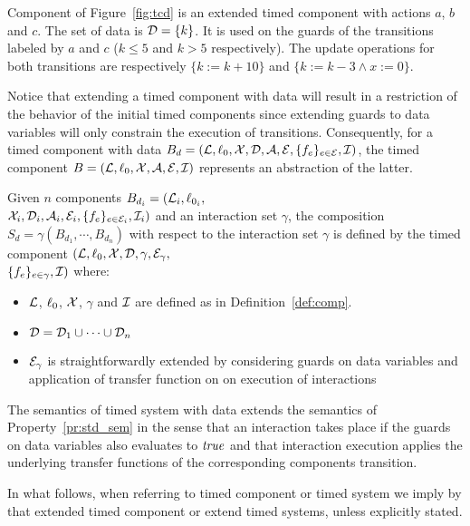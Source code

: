 
\begin{example}
  Component of Figure~\ref{fig:tcd} is an extended timed component with actions $a$, $b$ and $c$.
  The set of data is $\mathcal{D}=\{k\}$. It is used on the guards of the transitions labeled by
  $a$ and $c$ ($k\le 5$ and $k>5$ respectively). The update operations for both transitions
  are respectively $\{k:=k+10\}$ and $\{k:=k-3\wedge x:=0\}$.
\end{example}
\begin{remark}
  Notice that extending a timed component with data will result in a restriction
  of the behavior of the initial timed components since extending guards to data
  variables will only constrain the execution of transitions. Consequently,
  for a timed component with data $B_d=(\mathcal{L},\ell_0,\mathcal{X},\mathcal{D},\mathcal{A},\mathcal{E},\{f_e\}_{e\in\mathcal{E}},\mathcal{I})$, 
  the timed component $B=(\mathcal{L},\ell_0,\mathcal{X},\mathcal{A},\mathcal{E},\mathcal{I})$ represents an abstraction of the latter. 
\end{remark}

\begin{definition}\label{def:tce_sem}
  Given $n$ components $B_{d_i}=(\mathcal{L}_i,\ell_{0_i},$\\$\mathcal{X}_i,\mathcal{D}_i,\mathcal{A}_i,
  \mathcal{E}_i,\{f_e\}_{e\in\mathcal{E}_i},\mathcal{I}_i)$ and an interaction set $\gamma$,
  the composition $S_d=\gamma(B_{d_1},\cdots,B_{d_n})$ with respect to 
  the interaction set $\gamma$ is defined by the timed component 
  $(\mathcal{L},\ell_0,\mathcal{X},\mathcal{D},\gamma,\mathcal{E}_{\gamma},$\\$\{f_e\}_{e\in\gamma},\mathcal{I})$ where:
  \begin{itemize}
    \item $\mathcal{L}$, $\ell_0$, $\mathcal{X}$, $\gamma$ and $\mathcal{I}$ are defined as
      in Definition~\ref{def:comp}.
    \item $\mathcal{D}=\mathcal{D}_1\cup\cdots\cup\mathcal{D}_n$
    \item $\mathcal{E}_{\gamma}$ is straightforwardly extended by considering guards
      on data variables and application of transfer function on on execution of interactions
  \end{itemize}
\end{definition}
The semantics of timed system with data extends the semantics of Property~\ref{pr:std_sem}
in the sense that an interaction takes place if the guards on data variables also evaluates
to $\textnormal{\textit{true}}$ and that interaction execution applies the underlying transfer functions of the
corresponding components transition.

In what follows, when referring to timed component or timed system we imply by that 
extended timed component or extend timed systems, unless explicitly stated. 

